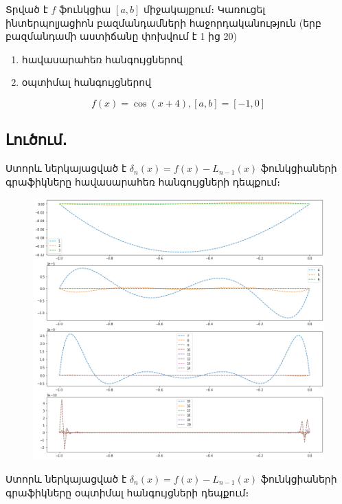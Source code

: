\documentclass{article}
\begin{document}
Տրված է $f$ ֆունկցիա $\left[a, b\right]$ միջակայքում։ Կառուցել ինտերպոլյացիոն բազմանդամների հաջորդականություն (երբ բազմանդամի աստիճանը փոխվում է   1 ից 20)

 \begin{enumerate}

\item հավասարահեռ հանգույցներով
\item օպտիմալ հանգույցներով
\end{enumerate}



$$f\left(x\right) = \cos\left(x+4\right), \left[a, b\right] = \left[-1 ,0\right]$$

\subsection*{Լուծում․}

Ստորև ներկայացված է $\delta_{n} \left(x\right) = f\left(x\right) - L_{n-1}\left(x\right)$ ֆունկցիաների գրաֆիկները հավասարահեռ հանգույցների դեպքում։

\begin{figure}[h]
   \includegraphics[width=\textwidth]{images/lagrange_equilateral_nodes}
\end{figure}

\newpage

Ստորև ներկայացված է $\delta_{n} \left(x\right) = f\left(x\right) - L_{n-1}\left(x\right)$ ֆունկցիաների գրաֆիկները օպտիմալ հանգույցների դեպքում։
\end{document}
